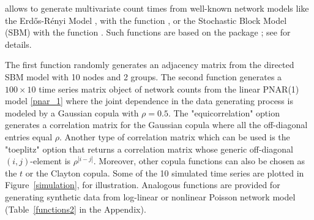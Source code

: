  allows to generate multivariate count times  from well-known network models like the Erd\H{o}s-R\'{e}nyi Model \citep{erdos_1959}, with the function , or the Stochastic Block Model (SBM) \citep{wang1987} with the function . Such functions are based on the  package \citep{csardi_2006}; see  \cite{armillotta_et_al_rpackage_2022} for details.

%	
%	


\noindent
The first function randomly generates an adjacency matrix from the directed SBM model with 10 nodes and 2 groups. The second function generates a $100 $   time series matrix object of network counts from the linear PNAR(1) model \eqref{pnar_1} where the joint dependence in the data generating process is modeled by a Gaussian copula with $$. The "equicorrelation" option generates a correlation matrix for the Gaussian copula where all the off-diagonal entries equal $\rho$. Another type of correlation matrix which  can be used is the "toeplitz" option that returns  a correlation matrix whose generic off-diagonal $(i, j)$-element is $\rho^{|i-j|}$. Moreover, other copula functions can also be chosen as the $t$ or the Clayton copula. Some of the 10 simulated time series are plotted in Figure~\ref{simulation}, for illustration. Analogous functions are provided for 
generating synthetic data from log-linear or nonlinear Poisson network model (Table~\ref{functions2} in the Appendix).


